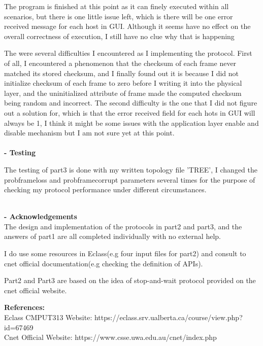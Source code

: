 \documentclass[12pt]{article}
\begin{document}
The program is finished at this point as it can finely executed within all scenarios, but there is one little issue left, which is there will be one error received message for each host in GUI. Although it seems have no effect on the overall correctness of execution, I still have no clue why that is happening

The were several difficulties I encountered as I implementing the protocol. First of all, I encountered a phenomenon that the checksum of each frame never matched its stored checksum, and I finally found out it is because I did not initialize checksum of each frame to zero before I writing it into the physical layer, and the uninitialized attribute of frame made the computed checksum being random and incorrect. The second difficulty is the one that I did not figure out a solution for, which is that the error received field for each hots in GUI will always be 1, I think it might be some issues with the application layer enable and disable mechanism but I am not sure yet at this point.\\
\\{\textbf{- Testing}}

The testing of part3 is done with my written topology file 'TREE', I changed the probframeloss and 
probframecorrupt parameters several times for the purpose of checking my protocol performance under different circumstances. 

~\\


\textbf{\large - Acknowledgements}\\

The design and implementation of the protocols in part2 and part3, and the answers of part1 are all completed individually with no external help.

I do use some resources in Eclass(e.g four input files for part2) and consult to cnet official documentation(e.g checking the definition of APIs).

Part2 and Part3 are based on the idea of stop-and-wait protocol provided on the cnet official website.

\textbf{References:}\\
Eclass CMPUT313 Website: https://eclass.srv.ualberta.ca/course/view.php?id=67469\\
Cnet Official Website: https://www.csse.uwa.edu.au/cnet/index.php

~\\
\end{document}
